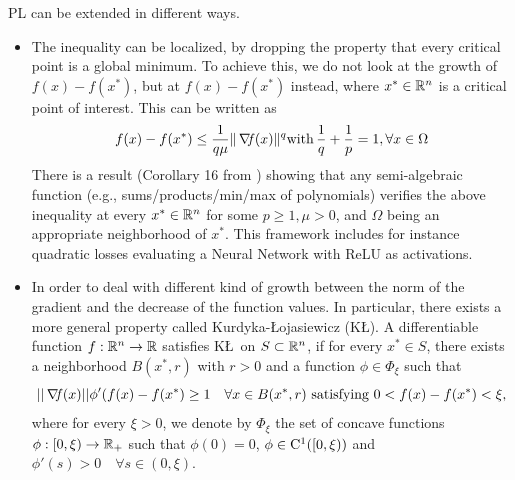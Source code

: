 \documentclass[10pt,a4paper]{article}
\begin{document}
\begin{remark}
	PL can be extended in different ways. 
	\begin{itemize}
		\item The inequality can be localized, by dropping the property that every critical point is
		a global minimum. To achieve this, we do not look at the growth of $f(x)-f(x^*)$, but at $f(x)-f(x^*)$
		instead, where $x^*\in \mathbb{R}^n$ is a critical point of interest. This can be written as 
		$$ f(x)-f(x^*)\leq \frac{1}{q\mu}\|\operatorname*{\mathit{\nabla \!f}}(x)\|^q  \mathord{\mathrm{with }}\, \frac{1}{q}+\frac{1}{p}=1, \forall x\in \Omega$$
		There is a result (Corollary 16 from \cite{bolte07a}) showing that any semi-algebraic function (e.g., sums/products/min/max of polynomials) verifies the above inequality at every $x^* \in \mathbb{R}^n$ for some $p\geq 1, \mu > 0$, and $\Omega$ being an appropriate neighborhood of $x^*$. This framework includes for instance quadratic losses evaluating a Neural Network with ReLU as activations.
		\item In order to deal with different kind of growth between the norm of the gradient and the decrease of the function values. In particular, there exists a more general property called Kurdyka-\L ojasiewicz (K\L). A differentiable function $f:\mathbb{R}^n\to\mathbb{R}$ satisfies K\L $\,$ on $S\subset \mathbb{R}^n$, if for every $x^*\in S$, there exists a neighborhood $B(x^*,r)$ with $r>0$ and a function $\phi \in \Phi_\xi$ such that 
		$$||\operatorname*{\mathit{\nabla \!f}}(x)|| \phi'(f(x) - f(x^*) \geq 1 \quad \forall x \in B(x^*,r) \text{ satisfying } 0<f(x)-f(x^*)<\xi,$$
		where for every $\xi>0$, we denote by $\Phi_\xi$ the set of concave functions $\phi:[0,\xi)\to\mathbb{R}_+$ such that $\phi(0)=0$, $\phi\in \mathord{\mathrm{C^1}}([0,\xi))$ and $\phi'(s)>0 \quad \forall s\in (0,\xi)$. 
	\end{itemize}
\end{remark}
\end{document}
